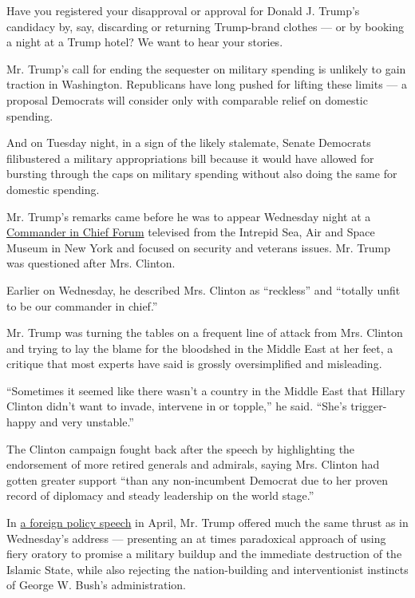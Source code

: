 Have you registered your disapproval or approval for Donald J. Trump's
candidacy by, say, discarding or returning Trump-brand clothes --- or by
booking a night at a Trump hotel? We want to hear your stories.

Mr. Trump's call for ending the sequester on military spending is
unlikely to gain traction in Washington. Republicans have long pushed
for lifting these limits --- a proposal Democrats will consider only
with comparable relief on domestic spending.

And on Tuesday night, in a sign of the likely stalemate, Senate
Democrats filibustered a military appropriations bill because it would
have allowed for bursting through the caps on military spending without
also doing the same for domestic spending.

Mr. Trump's remarks came before he was to appear Wednesday night at a
\href{http://www.nytimes.com/2016/09/08/us/politics/hillary-clinton-donald-trump-national-security.html?ref=politics}{Commander
in Chief Forum} televised from the Intrepid Sea, Air and Space Museum in
New York and focused on security and veterans issues. Mr. Trump was
questioned after Mrs. Clinton.

Earlier on Wednesday, he described Mrs. Clinton as ``reckless'' and
``totally unfit to be our commander in chief.''

Mr. Trump was turning the tables on a frequent line of attack from Mrs.
Clinton and trying to lay the blame for the bloodshed in the Middle East
at her feet, a critique that most experts have said is grossly
oversimplified and misleading.

``Sometimes it seemed like there wasn't a country in the Middle East
that Hillary Clinton didn't want to invade, intervene in or topple,'' he
said. ``She's trigger-happy and very unstable.''

The Clinton campaign fought back after the speech by highlighting the
endorsement of more retired generals and admirals, saying Mrs. Clinton
had gotten greater support ``than any non-incumbent Democrat due to her
proven record of diplomacy and steady leadership on the world stage.''

In
\href{http://www.nytimes.com/2016/04/28/us/politics/donald-trump-foreign-policy-speech.html?_r=0}{a
foreign policy speech} in April, Mr. Trump offered much the same thrust
as in Wednesday's address --- presenting an at times paradoxical
approach of using fiery oratory to promise a military buildup and the
immediate destruction of the Islamic State, while also rejecting the
nation-building and interventionist instincts of George W. Bush's
administration.

